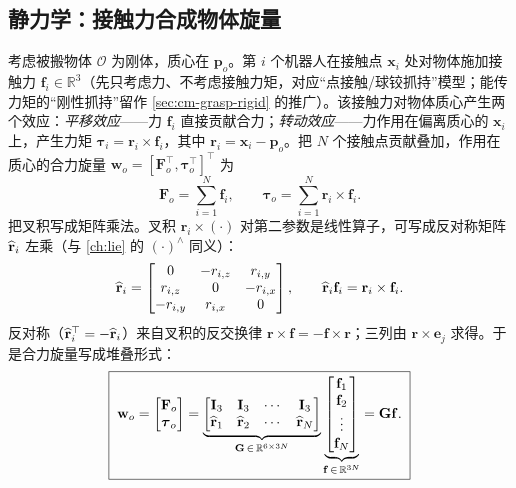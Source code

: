 \subsection{静力学：接触力合成物体旋量}
\label{sec:cm-grasp-statics}
考虑被搬物体 $\mathcal{O}$ 为刚体，质心在 $\mathbf{p}_o$。第 $i$ 个机器人在接触点 $\mathbf{x}_i$ 处对物体施加接触力 $\mathbf{f}_i\in\mathbb{R}^3$（先只考虑力、不考虑接触力矩，对应“点接触/球铰抓持”模型；能传力矩的“刚性抓持”留作 \cref{sec:cm-grasp-rigid} 的推广）。该接触力对物体质心产生两个效应：\emph{平移效应}——力 $\mathbf{f}_i$ 直接贡献合力；\emph{转动效应}——力作用在偏离质心的 $\mathbf{x}_i$ 上，产生力矩 $\boldsymbol{\tau}_i=\mathbf{r}_i\times\mathbf{f}_i$，其中 $\mathbf{r}_i=\mathbf{x}_i-\mathbf{p}_o$。把 $N$ 个接触点贡献叠加，作用在质心的合力旋量 $\mathbf{w}_o=[\mathbf{F}_o^\top,\boldsymbol{\tau}_o^\top]^\top$ 为
\begin{equation}
  \mathbf{F}_o=\sum_{i=1}^N\mathbf{f}_i,\qquad \boldsymbol{\tau}_o=\sum_{i=1}^N\mathbf{r}_i\times\mathbf{f}_i.
  \label{eq:cm-wrench-sum}
\end{equation}
把叉积写成矩阵乘法。叉积 $\mathbf{r}_i\times(\cdot)$ 对第二参数是线性算子，可写成反对称矩阵 $\widehat{\mathbf{r}}_i$ 左乘（与 \cref{ch:lie} 的 $(\cdot)^\wedge$ 同义）：
\begin{equation}
  \widehat{\mathbf{r}}_i=
  \begin{bmatrix}0&-r_{i,z}&r_{i,y}\\ r_{i,z}&0&-r_{i,x}\\ -r_{i,y}&r_{i,x}&0\end{bmatrix},
  \qquad \widehat{\mathbf{r}}_i\mathbf{f}_i=\mathbf{r}_i\times\mathbf{f}_i.
  \label{eq:cm-skew}
\end{equation}
反对称（$\widehat{\mathbf{r}}_i^\top=-\widehat{\mathbf{r}}_i$）来自叉积的反交换律 $\mathbf{r}\times\mathbf{f}=-\mathbf{f}\times\mathbf{r}$；三列由 $\mathbf{r}\times\mathbf{e}_j$ 求得。于是合力旋量写成堆叠形式：
\begin{equation}
\boxed{\;
  \mathbf{w}_o=\begin{bmatrix}\mathbf{F}_o\\ \boldsymbol{\tau}_o\end{bmatrix}
  =\underbrace{\begin{bmatrix}\mathbf{I}_3&\mathbf{I}_3&\cdots&\mathbf{I}_3\\ \widehat{\mathbf{r}}_1&\widehat{\mathbf{r}}_2&\cdots&\widehat{\mathbf{r}}_N\end{bmatrix}}_{\mathbf{G}\,\in\,\mathbb{R}^{6\times 3N}}
  \underbrace{\begin{bmatrix}\mathbf{f}_1\\ \mathbf{f}_2\\ \vdots\\ \mathbf{f}_N\end{bmatrix}}_{\mathbf{f}\,\in\,\mathbb{R}^{3N}}=\mathbf{G}\mathbf{f}.
\;}
  \label{eq:cm-grasp}
\end{equation}
